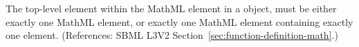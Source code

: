 The top-level element within the MathML  element in a
\FunctionDefinition object,  must be either exactly one MathML 
element, or exactly one MathML  element containing exactly
one  element.  (References: SBML L3V2
Section~\ref{sec:function-definition-math}.)
